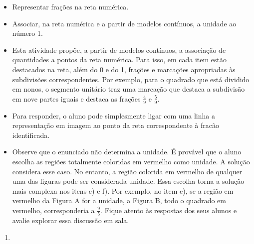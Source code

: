 \begin{atividade}\label{chap3-ativ4}
\objetivos
\begin{itemize} %
    \item Representar frações na reta numérica.
    \item Associar, na reta numérica e a partir de modelos contínuos, a unidade ao número 1.
\end{itemize} %

\discussoes
\begin{itemize} %
    \item       Esta atividade propõe, a partir de modelos contínuos, a associação de quantidades a pontos da reta numérica. Para isso, em cada item estão destacados na reta, além do 0 e do 1, frações e marcações apropriadas às subdivisões correspondentes. Por exemplo, para o quadrado que  está dividido em nonos, o segmento unitário traz uma marcação que destaca a subdivisão em nove partes iguais e destaca as frações $\frac{4}{9}$ e $\frac{5}{9}$.
    \item Para responder, o aluno pode simplesmente ligar com uma linha a representação em imagem ao ponto da reta correspondente à fracão identificada.
    \item Observe que o enunciado não determina a unidade. É provável que o aluno escolha as regiões totalmente coloridas em vermelho como unidade. A solução considera esse caso. No entanto, a região colorida em vermelho de qualquer uma das figuras pode ser considerada unidade. Essa escolha torna a solução mais complexa nos itens c) e f). Por exemplo, no item c), se a região em vermelho da Figura A for a unidade, a Figura B, todo o quadrado em vermelho, corresponderia a $\frac{9}{5}$. Fique atento às respostas dos seus alunos e avalie explorar essa discussão em sala.
\end{itemize} %

\solucao
\begin{enumerate}
\item {}
{
}


\end{enumerate}
\end{atividade}

